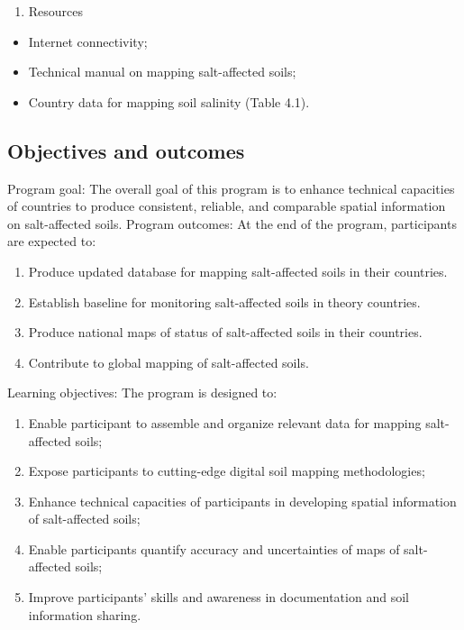 \documentclass[
  10pt,
  b5paper,
]{book}
\providecommand{\tightlist}{%
  \setlength{\itemsep}{0pt}\setlength{\parskip}{0pt}}
\begin{document}
\begin{enumerate}
\def\labelenumi{\arabic{enumi})}
\setcounter{enumi}{2}
\tightlist
\item
  Resources
\end{enumerate}

\begin{itemize}
\tightlist
\item
  Internet connectivity;
\item
  Technical manual on mapping salt-affected soils;
\item
  Country data for mapping soil salinity (Table 4.1).
\end{itemize}

\hypertarget{objectives-and-outcomes}{%
\subsection{Objectives and outcomes}\label{objectives-and-outcomes}}

Program goal: The overall goal of this program is to enhance technical capacities of countries to produce consistent, reliable, and comparable spatial information on salt-affected soils.
Program outcomes: At the end of the program, participants are expected to:

\begin{enumerate}
\def\labelenumi{\arabic{enumi}.}
\tightlist
\item
  Produce updated database for mapping salt-affected soils in their countries.
\item
  Establish baseline for monitoring salt-affected soils in theory countries.
\item
  Produce national maps of status of salt-affected soils in their countries.
\item
  Contribute to global mapping of salt-affected soils.
\end{enumerate}

Learning objectives: The program is designed to:

\begin{enumerate}
\def\labelenumi{\arabic{enumi}.}
\tightlist
\item
  Enable participant to assemble and organize relevant data for mapping salt-affected soils;
\item
  Expose participants to cutting-edge digital soil mapping methodologies;
\item
  Enhance technical capacities of participants in developing spatial information of salt-affected soils;
\item
  Enable participants quantify accuracy and uncertainties of maps of salt-affected soils;
\item
  Improve participants' skills and awareness in documentation and soil information sharing.
\end{enumerate}
\end{document}
